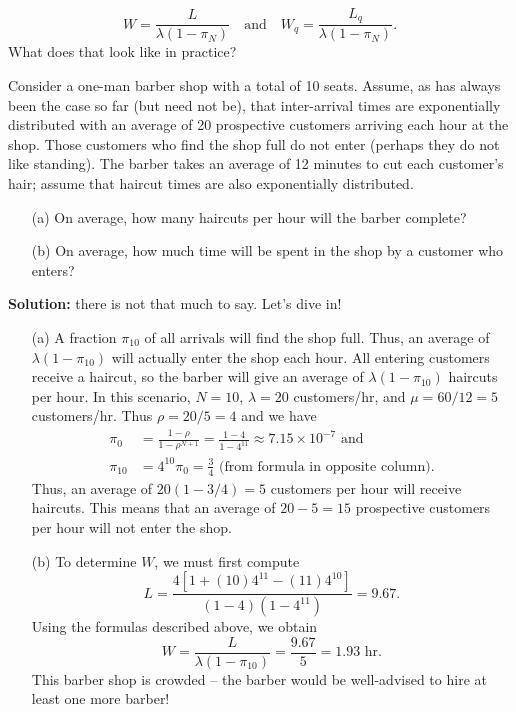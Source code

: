 $$ W = \frac{L}{\lambda\left(1-\pi_{N}\right)}\quad \text{and}\quad W_{q} = \frac{L_{q}}{\lambda\left(1-\pi_{N}\right)}.$$
What does that look like in practice? 
\begin{Example} Consider a one-man barber shop with a total of 10 seats. Assume, as has always been the case so far (but need not be), that inter-arrival times are exponentially distributed with an average of 20 prospective customers arriving each hour at the shop. Those customers who find the shop full do not enter (perhaps they do not like standing). The barber takes an average of 12 minutes to cut each customer's hair; assume that haircut times are also exponentially distributed.
\begin{itemize}[noitemsep]
	\item[(a)] On average, how many haircuts per hour will the barber complete?
	\item[(b)] On average, how much time will be spent in the shop by a customer who enters?
\end{itemize}
\textbf{Solution:} there is not that much to say. Let's dive in!
\begin{itemize}[noitemsep]
	\item[(a)] A fraction $\pi_{10}$ of all arrivals will find the shop full. Thus, an average of $\lambda\left(1-\pi_{10}\right)$ will actually enter the shop each hour.  All entering customers receive a haircut, so the barber will give an average of $\lambda\left(1-\pi_{10}\right)$ haircuts per hour. In this scenario, $N=10$, $\lambda=20$ customers/hr, and $\mu=60/12 = 5 $ customers/hr. Thus $\rho= 20/5 = 4$ and  we have 
	\begin{align*} \pi_{0} &= \frac{1-\rho}{1-\rho^{N+1}} = \frac{1-4}{1-4^{11}}\approx 7.15\times 10^{-7}  \text{ and} \\ \pi_{10} &= 4^{10} \pi_{0} = \frac{3}{4} \text{ (from formula in opposite column)}.\end{align*}
Thus, an average of $20(1 - 3/4)= 5$ customers per hour will receive haircuts. This means that an average of $20 - 5 = 15$ prospective customers per hour will not enter the shop.	
\item[(b)] To determine $W$, we must first compute 
$$L = \frac{4 [1+ (10) 4^{11} - (11) 4^{10} ]}{(1-4)\left(1-4^{11}\right)} = 9.67.$$ 
Using the formulas described above, we obtain 
$$ W = \frac{L}{\lambda\left(1-\pi_{10}\right)} = \frac{9.67}{5} = 1.93 \text{ hr}.$$
This barber shop is crowded -- the barber would be well-advised to hire at least one more barber!
\end{itemize}
\end{Example}
